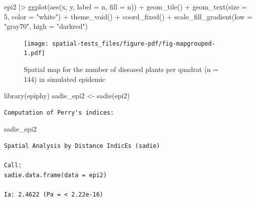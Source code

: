 \documentclass[
  letterpaper,
]{book}
\newenvironment{Shaded}{\begin{snugshade}}{\end{snugshade}}
\newcommand{\AttributeTok}[1]{\textcolor[rgb]{0.40,0.45,0.13}{#1}}
\newcommand{\DecValTok}[1]{\textcolor[rgb]{0.68,0.00,0.00}{#1}}
\newcommand{\FunctionTok}[1]{\textcolor[rgb]{0.28,0.35,0.67}{#1}}
\newcommand{\NormalTok}[1]{\textcolor[rgb]{0.00,0.23,0.31}{#1}}
\newcommand{\OtherTok}[1]{\textcolor[rgb]{0.00,0.23,0.31}{#1}}
\newcommand{\SpecialCharTok}[1]{\textcolor[rgb]{0.37,0.37,0.37}{#1}}
\newcommand{\StringTok}[1]{\textcolor[rgb]{0.13,0.47,0.30}{#1}}
\begin{document}
\begin{Shaded}
\begin{Highlighting}[]
\NormalTok{epi2 }\SpecialCharTok{|\textgreater{}}
  \FunctionTok{ggplot}\NormalTok{(}\FunctionTok{aes}\NormalTok{(x, y, }\AttributeTok{label =}\NormalTok{ n, }\AttributeTok{fill =}\NormalTok{ n)) }\SpecialCharTok{+}
  \FunctionTok{geom\_tile}\NormalTok{() }\SpecialCharTok{+}
  \FunctionTok{geom\_text}\NormalTok{(}\AttributeTok{size =} \DecValTok{5}\NormalTok{, }\AttributeTok{color =} \StringTok{"white"}\NormalTok{) }\SpecialCharTok{+}
  \FunctionTok{theme\_void}\NormalTok{() }\SpecialCharTok{+}
  \FunctionTok{coord\_fixed}\NormalTok{() }\SpecialCharTok{+}
  \FunctionTok{scale\_fill\_gradient}\NormalTok{(}\AttributeTok{low =} \StringTok{"gray70"}\NormalTok{, }\AttributeTok{high =} \StringTok{"darkred"}\NormalTok{)}
\end{Highlighting}
\end{Shaded}

\begin{figure}[H]

\texttt{[image: spatial-tests\_files/figure-pdf/fig-mapgrouped-1.pdf]} \hfill{}

\caption{\label{fig-mapgrouped}Spatial map for the number of diseased
plants per quadrat (n = 144) in simulated epidemic}

\end{figure}

\begin{Shaded}
\begin{Highlighting}[]
\FunctionTok{library}\NormalTok{(epiphy)}
\NormalTok{sadie\_epi2 }\OtherTok{\textless{}{-}} \FunctionTok{sadie}\NormalTok{(epi2)}
\end{Highlighting}
\end{Shaded}

\begin{verbatim}
Computation of Perry's indices:
\end{verbatim}

\begin{Shaded}
\begin{Highlighting}[]
\NormalTok{sadie\_epi2}
\end{Highlighting}
\end{Shaded}

\begin{verbatim}
Spatial Analysis by Distance IndicEs (sadie)

Call:
sadie.data.frame(data = epi2)

Ia: 2.4622 (Pa = < 2.22e-16)
\end{verbatim}
\end{document}
